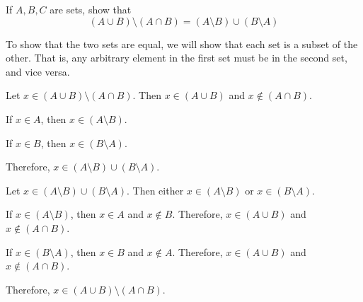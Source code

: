 \begin{problem}
  If $A, B, C$ are sets, show that
  \[ (A \cup B) \setminus (A \cap B) = (A \setminus B) \cup (B \setminus A) \]
\end{problem}

\begin{answer}
  To show that the two sets are equal, we will show that each set is a subset
  of the other. That is, any arbitrary element in the first set must be in
  the second set, and vice versa.

  \begin{enumroman}
    \item Let $x \in (A \cup B) \setminus (A \cap B)$. Then $x \in (A \cup B)$
      and $x \notin (A \cap B)$.
      \begin{enumarabic}
        \item If $x \in A$, then $x \in (A \setminus B)$.
        \item If $x \in B$, then $x \in (B \setminus A)$.
      \end{enumarabic}
      Therefore, $x \in (A \setminus B) \cup (B \setminus A)$.

    \item Let $x \in (A \setminus B) \cup (B \setminus A)$. Then either $x \in (A \setminus B)$
      or $x \in (B \setminus A)$.
      \begin{enumarabic}
        \item If $x \in (A \setminus B)$, then $x \in A$ and $x \notin B$.
          Therefore, $x \in (A \cup B)$ and $x \notin (A \cap B)$.
        \item If $x \in (B \setminus A)$, then $x \in B$ and $x \notin A$.
          Therefore, $x \in (A \cup B)$ and $x \notin (A \cap B)$.
      \end{enumarabic}
      Therefore, $x \in (A \cup B) \setminus (A \cap B)$.
  \end{enumroman}
\end{answer}
